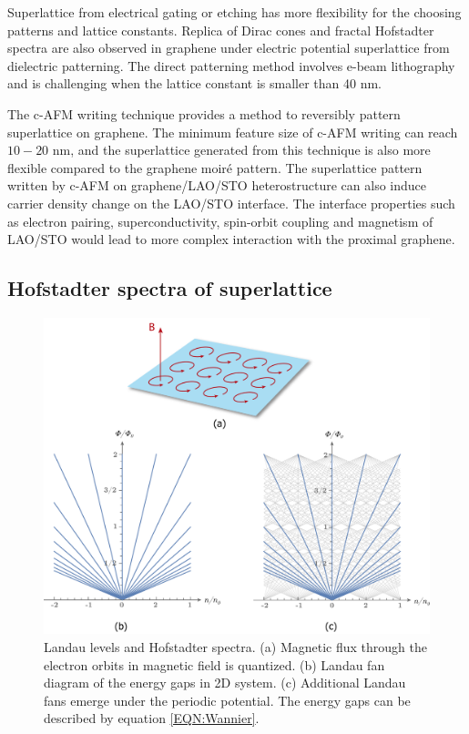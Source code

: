 \documentclass[pdflatex, sectionletters, 12pt]{pittetd}    %
\begin{document}
Superlattice from electrical gating\cite{forsythe2018band} or etching\cite{jessen2019lithographic} has more flexibility for the choosing patterns and lattice constants. Replica of Dirac cones and fractal Hofstadter spectra are also observed in graphene under electric potential superlattice from dielectric patterning\cite{forsythe2018band}. The direct patterning method involves e-beam lithography and is challenging when the lattice constant is smaller than 40 nm.

The c-AFM writing technique provides a method to reversibly pattern superlattice on graphene. The minimum feature size of c-AFM writing can reach $10-20$ nm\cite{huang2015electric}, and the superlattice generated from this technique is also more flexible compared to the graphene moir{\'e} pattern. The superlattice pattern written by c-AFM on graphene/LAO/STO heterostructure can also induce carrier density change on the LAO/STO interface\cite{huang2015electric}. The interface properties such as electron pairing\cite{cheng2015electron}, superconductivity\cite{reyren2007superconducting}, spin-orbit coupling\cite{caviglia2010tunable, zhong2013theory} and magnetism\cite{bi2014room} of LAO/STO would lead to more complex interaction with the proximal graphene.

\subsection{Hofstadter spectra of superlattice}

\begin{figure}[h!]
	\centering
	\includegraphics[width=1.0\textwidth]{Drawing/HofstadterLandau.pdf}
	\caption{Landau levels and Hofstadter spectra. (a) Magnetic flux through the electron orbits in magnetic field is quantized. (b) Landau fan diagram of the energy gaps in 2D system. (c) Additional Landau fans emerge under the periodic potential. The energy gaps can be described by equation \ref{EQN:Wannier}.}
	\label{FIG:HofstadterLandau}
\end{figure}
\end{document}
